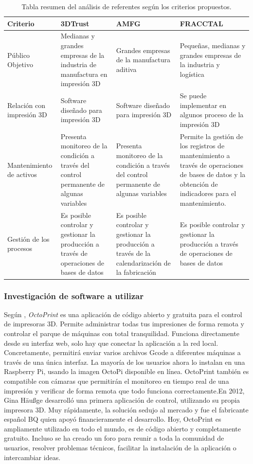\begin{table}[H]
\centering
\begin{tabular}{|p{2.5cm}|p{3.4cm}|p{3.4cm}|p{3.4cm}|}
\hline
Criterio & 3DTrust & AMFG & FRACCTAL \\
\hline
Público Objetivo & Medianas y grandes empresas de la industria de manufactura en impresión 3D& Grandes empresas de la manufactura aditiva & Pequeñas, medianas y grandes empresas de la industria y logística\\
\hline
Relación con impresión 3D & Software diseñado para impresión 3D & Software diseñado para impresión 3D & Se puede implementar en algunos proceso de la impresión 3D \\
\hline
Mantenimiento de activos & Presenta monitoreo de la condición a través del control permanente de algunas variables & Presenta monitoreo de la condición a través del control permanente de algunas variables & Permite la gestión de los registros de mantenimiento a través de operaciones de bases de datos y la obtención de indicadores para el mantenimiento.\\
\hline

Gestión de los procesos & Es posible controlar y gestionar la producción a través de operaciones de bases de datos & Es posible controlar y gestionar la producción a través de la calendarización de la fabricación & Es posible controlar y gestionar la producción a través de operaciones de bases de datos\\
\hline
\end{tabular}
\caption{Tabla resumen del análisis de referentes según los criterios propuestos.}
\end{table}

\subsubsection{Investigación de software a utilizar}

Según \cite{marchante2020}, \textit{OctoPrint} es una aplicación de código abierto y gratuita para el control de impresoras 3D. Permite administrar todas tus impresiones de forma remota y controlar el parque de máquinas con total tranquilidad. Funciona directamente desde su interfaz web, solo hay que conectar la aplicación a la red local. Concretamente, permitirá enviar varios archivos Gcode a diferentes máquinas a través de una única interfaz. La mayoría de los usuarios ahora lo instalan en una Raspberry Pi, usando la imagen OctoPi disponible en línea. OctoPrint también es compatible con cámaras que permitirán el monitoreo en tiempo real de una impresión y verificar de forma remota que todo funciona correctamente.En 2012, Gina Häußge desarrolló una primera aplicación de control, utilizando su propia impresora 3D. Muy rápidamente, la solución sedujo al mercado y fue el fabricante español BQ quien apoyó financieramente el desarrollo. Hoy, OctoPrint es ampliamente utilizado en todo el mundo, es de código abierto y completamente gratuito. Incluso se ha creado un foro para reunir a toda la comunidad de usuarios, resolver problemas técnicos, facilitar la instalación de la aplicación o intercambiar ideas.

